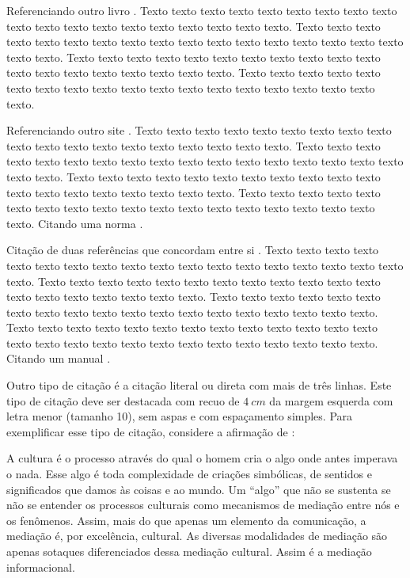 
    Referenciando outro livro \cite{LangtangenLogg2017}. Texto texto texto texto texto texto texto texto texto texto texto texto texto texto texto texto texto texto texto. Texto texto texto texto texto texto texto texto texto texto texto texto texto texto texto texto texto texto texto. Texto texto texto texto texto texto texto texto texto texto texto texto texto texto texto texto texto texto texto. Texto texto texto texto texto texto texto texto texto texto texto texto texto texto texto texto texto texto texto.

    Referenciando outro site \cite{secretaria1999}. Texto texto texto texto texto texto texto texto texto texto texto texto texto texto texto texto texto texto texto. Texto texto texto texto texto texto texto texto texto texto texto texto texto texto texto texto texto texto texto. Texto texto texto texto texto texto texto texto texto texto texto texto texto texto texto texto texto texto texto. Texto texto texto texto texto texto texto texto texto texto texto texto texto texto texto texto texto texto texto. Citando uma norma \cite{NBR10520:2002}.
        
    Citação de duas referências que concordam entre si \cite{Almeida2018,Gondim2017}. Texto texto texto texto texto texto texto texto texto texto texto texto texto texto texto texto texto texto texto. Texto texto texto texto texto texto texto texto texto texto texto texto texto texto texto texto texto texto texto. Texto texto texto texto texto texto texto texto texto texto texto texto texto texto texto texto texto texto texto. Texto texto texto texto texto texto texto texto texto texto texto texto texto texto texto texto texto texto texto texto texto texto texto texto texto texto. Citando um manual \cite{manuais1989}. 
        
    Outro tipo de citação é a citação literal ou direta com mais de três linhas. Este tipo de citação deve ser destacada com recuo de $4~cm$ da margem esquerda com letra menor (tamanho 10), sem aspas e com espaçamento simples.  Para exemplificar esse tipo de citação, considere a afirmação de :
    \begin{citacao}
        A cultura é o processo através do qual o homem cria o algo onde antes imperava o nada. Esse algo é toda complexidade de criações simbólicas, de sentidos e significados que damos às coisas e ao mundo. Um ``algo'' que não se sustenta se não se entender os processos culturais como mecanismos de mediação entre nós e os fenômenos. Assim, mais do que apenas um elemento da comunicação, a mediação é, por excelência, cultural. As diversas modalidades de mediação são apenas sotaques diferenciados dessa mediação cultural. Assim é a mediação informacional.
    \end{citacao}
        
